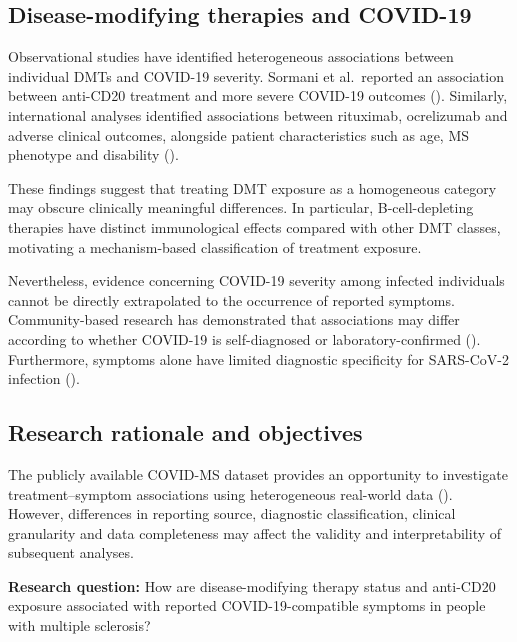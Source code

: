 \documentclass[
  british,
]{article}
\begin{document}
\subsection{Disease-modifying therapies and
COVID-19}\label{disease-modifying-therapies-and-covid-19}

Observational studies have identified heterogeneous associations between
individual DMTs and COVID-19 severity. Sormani et al.~reported an
association between anti-CD20 treatment and more severe COVID-19
outcomes (). Similarly,
international analyses identified associations between rituximab,
ocrelizumab and adverse clinical outcomes, alongside patient
characteristics such as age, MS phenotype and disability
().

These findings suggest that treating DMT exposure as a homogeneous
category may obscure clinically meaningful differences. In particular,
B-cell-depleting therapies have distinct immunological effects compared
with other DMT classes, motivating a mechanism-based classification of
treatment exposure.

Nevertheless, evidence concerning COVID-19 severity among infected
individuals cannot be directly extrapolated to the occurrence of
reported symptoms. Community-based research has demonstrated that
associations may differ according to whether COVID-19 is self-diagnosed
or laboratory-confirmed (). Furthermore, symptoms alone have limited diagnostic specificity
for SARS-CoV-2 infection ().

\subsection{Research rationale and
objectives}\label{research-rationale-and-objectives}

The publicly available COVID-MS dataset provides an opportunity to
investigate treatment--symptom associations using heterogeneous
real-world data (). However,
differences in reporting source, diagnostic classification, clinical
granularity and data completeness may affect the validity and
interpretability of subsequent analyses.

\textbf{Research question:} How are disease-modifying therapy status and
anti-CD20 exposure associated with reported COVID-19-compatible symptoms
in people with multiple sclerosis?
\end{document}
